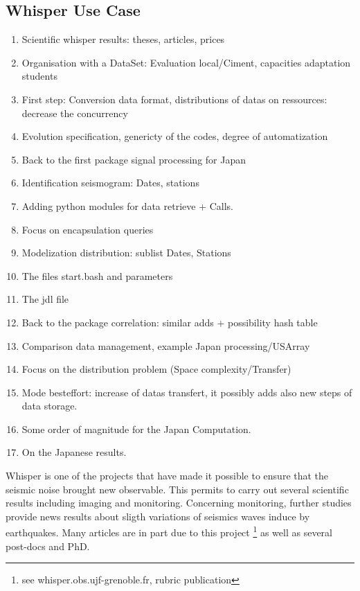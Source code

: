 \documentclass[a4paper, 10pt]{article}
\begin{document}
\begin{multicols}{2}
\subsection{Whisper Use Case}

	\begin{enumerate}
	  \item Scientific whisper results: theses, articles, prices
  	  \item Organisation with a DataSet: Evaluation local/Ciment, capacities adaptation students
  	  \item First step: Conversion data format, distributions of datas on ressources: decrease the concurrency
  	  \item Evolution specification, genericty of the codes, degree of automatization
  	  \item Back to the first package signal processing for Japan
  	  \item Identification seismogram: Dates, stations
  	  \item Adding python modules for data retrieve + Calls.
  	  \item Focus on encapsulation queries
  	  \item Modelization distribution: sublist Dates, Stations
      \item The files start.bash and parameters
      \item The jdl file
  	  \item Back to the package correlation: similar adds + possibility hash table
  	  \item Comparison data management, example Japan processing/USArray 
  	  \item Focus on the distribution problem (Space complexity/Transfer)
  	  \item Mode besteffort: increase of datas transfert, it possibly adds also new steps of data storage.
  	  \item Some order of magnitude for the Japan Computation.
  	  \item On the Japanese results.
  	\end{enumerate}


Whisper is one of the projects that have made it possible to ensure that the seismic noise brought new observable.
This permits to carry out several scientific results including imaging and monitoring. 
Concerning monitoring, further studies provide news results about sligth variations of seismics waves induce by earthquakes.
Many articles are in part due to this project \footnote{see whisper.obs.ujf-grenoble.fr, rubric publication} as well as
several post-docs and PhD.



\end{multicols}
\end{document}
